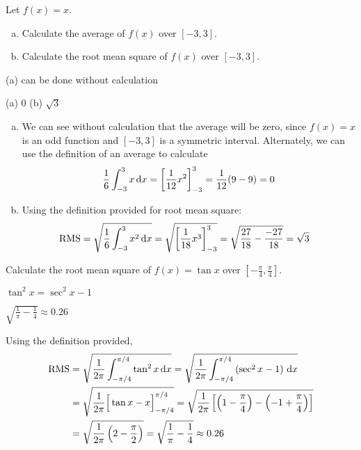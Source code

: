 \begin{Mquestion}\label{prob_s2.2:RMS1}
Let $f(x) = x$.
\begin{enumerate}[(a)]
\item Calculate the average of $f(x)$ over $[-3,3]$.
\item Calculate the root mean square of $f(x)$ over $[-3,3]$.
\end{enumerate}
\end{Mquestion}
\begin{hint}
(a) can be done without calculation
\end{hint}
\begin{answer}
(a) 0 \qquad (b) $\sqrt3$
\end{answer}
\begin{solution}
\begin{enumerate}[(a)]
\item We can see without calculation that the average will be zero, since $f(x)=x$ is an odd function and $[-3,3]$ is a symmetric interval. Alternately, we can use the definition of an average to calculate
\[\frac{1}{6}\int_{-3}^3 x\,\mathrm{d}x = \left[\frac{1}{12}x^2\right]_{-3}^3 = \frac{1}{12}(9-9)=0\]
\item Using the definition provided for root mean square:
\begin{align*}
\text{RMS}&=\sqrt{\frac{1}{6}\int_{-3}^3 x^2\,\mathrm{d}x} = \sqrt{\left[\frac{1}{18}x^3\right]_{-3}^3}
= \sqrt{\frac{27}{18}-\frac{-27}{18}} = \sqrt{3}
\end{align*}
\end{enumerate}

\end{solution}

\begin{question}
Calculate the root mean square of $f(x) = \tan x$ over $\left[-\frac{\pi}{4},\frac{\pi}{4}\right]$.
\end{question}
\begin{hint}
$\tan^2 x = \sec^2 x - 1$
\end{hint}
\begin{answer}
$\displaystyle\sqrt{\frac{1}{\pi} - \frac{1}{4}}\approx 0.26$
\end{answer}
\begin{solution}
Using the definition provided,
\begin{align*}
\text{RMS}&=\sqrt{\frac{1}{2\pi}\int_{-\pi/4}^{\pi/4}\tan^2x\,\mathrm{d}x} = \sqrt{\frac{1}{2\pi}\int_{-\pi/4}^{\pi/4}\left(\sec^2x-1\right)\,\mathrm{d}x}\\
&=\sqrt{\frac{1}{2\pi}\Big[\tan x - x \Big]_{-\pi/4}^{\pi/4}} =
\sqrt{\frac{1}{2\pi}\left[\left(1 - \frac{\pi}{4} \right)-\left(-1 + \frac{\pi}{4} \right)\right]}\\
&=\sqrt{\frac{1}{2\pi}\left(2-\frac{\pi}{2}\right)} = \sqrt{\frac{1}{\pi} - \frac{1}{4}}\approx 0.26
\end{align*}
\end{solution}


